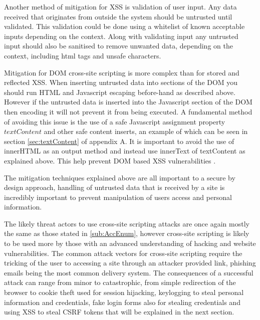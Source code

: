 \documentclass{ueacmpstyle}
\begin{document}
      Another method of mitigation for XSS is validation of user input. Any data received 
      that originates from outside the system should be untrusted until validated. This 
      validation could be done using a whitelist of known acceptable inputs depending on 
      the context.
      Along with validating input any untrusted input should also be sanitised to remove 
      unwanted data, depending on the context, including html tags and unsafe characters. 

      Mitigation for DOM cross-site scripting is more complex than for stored and reflected 
      XSS. When inserting untrusted data into sections of the DOM you should run HTML and 
      Javascript escaping before-hand as described above. However if the untrusted data is 
      inserted into the Javascript section of the DOM then encoding it will not prevent it 
      from being executed. A fundamental method of avoiding this issue is the use of a safe 
      Javascript assignment property $textContent$ and other safe content inserts, an example 
      of which can be seen in section \ref{sec:textContent} of appendix A. It is important 
      to avoid the use of innerHTML as an output method and instead use innerText of 
      textContent as explained above. This help prevent DOM based XSS vulnerabilities 
      \citep{OWASPDOMXSSPrevention}. 

      The mitigation techniques explained above are all important to a secure by design 
      approach, handling of untrusted data that is received by a site is incredibly important 
      to prevent manipulation of users access and personal information.

      The likely threat actors to use cross-site scripting attacks are once again mostly the 
      same as those stated in \ref{sub:AccEnum}, however cross-site scripting is likely to be 
      used more by those with an advanced understanding of hacking and website vulnerabilities. 
      The common attack vectors for cross-site scripting require the tricking of the user to 
      accessing a site through an attacker provided link, phishing emails being the most common 
      delivery system. The consequences of a successful attack can range from minor to 
      catastrophic, from simple redirection of the browser to cookie theft used for session 
      hijacking, keylogging to steal personal information and credentials, fake login forms also 
      for stealing credentials and using XSS to steal CSRF tokens that will be explained in 
      the next section.
\end{document}
